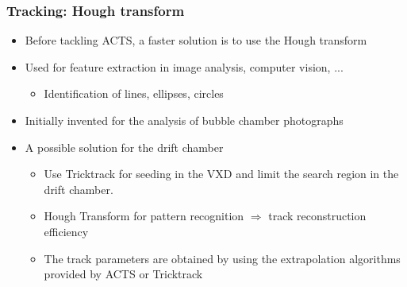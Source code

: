 \documentclass[aspectratio=169, hyperref={colorlinks=true,pdfpagelabels=false,linkcolor=black}, xcolor=dvipsnames,10pt]{beamer}
\begin{document}
\begin{frame}
  \frametitle{Tracking: Hough transform}

  \begin{itemize}
    \item Before tackling ACTS, a faster solution is to use the Hough transform
    \item Used for feature extraction in image analysis, computer vision, ...
      \begin{itemize}
        \item Identification of lines, ellipses, circles
      \end{itemize}
    \item Initially invented for the analysis of bubble chamber photographs
    \item A possible solution for the drift chamber
    \begin{itemize}
      \item Use Tricktrack for seeding in the VXD and limit the search region in the drift chamber.
      \item Hough Transform for pattern recognition $\Rightarrow$ track reconstruction efficiency
      \item The track parameters are obtained by using the extrapolation algorithms provided by ACTS or Tricktrack
    \end{itemize}
  \end{itemize}

\end{frame}
\end{document}
